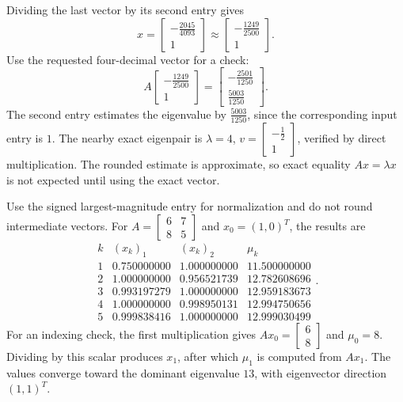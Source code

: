 Dividing the last vector by its second entry gives
\[x=\left[\begin{matrix}- \frac{2045}{4093}\\1\end{matrix}\right]\approx\left[\begin{matrix}- \frac{1249}{2500}\\1\end{matrix}\right].\]
Use the requested four-decimal vector for a check:
\[A\left[\begin{matrix}- \frac{1249}{2500}\\1\end{matrix}\right]=\left[\begin{matrix}- \frac{2501}{1250}\\\frac{5003}{1250}\end{matrix}\right].\]
The second entry estimates the eigenvalue by $\frac{5003}{1250}$,
since the corresponding input entry is $1$.
The nearby exact eigenpair is $\lambda=4$,
$v=\left[\begin{matrix}- \frac{1}{2}\\1\end{matrix}\right]$, verified by direct multiplication.
The rounded estimate is approximate, so exact equality $Ax=\lambda x$
is not expected until using the exact vector.

Use the signed largest-magnitude entry for normalization and do not
round intermediate vectors. For $A=\left[\begin{matrix}6 & 7\\8 & 5\end{matrix}\right]$ and $x_0=(1,0)^T$,
the results are
\[\begin{array}{c|rr|r}k&(x_k)_1&(x_k)_2&\mu_k\\\hline
1&0.750000000&1.000000000&11.500000000\\
2&1.000000000&0.956521739&12.782608696\\
3&0.993197279&1.000000000&12.959183673\\
4&1.000000000&0.998950131&12.994750656\\
5&0.999838416&1.000000000&12.999030499\end{array}.\]
For an indexing check, the first multiplication gives
$Ax_0=\left[\begin{matrix}6\\8\end{matrix}\right]$ and
$\mu_0=8$. Dividing by this scalar produces
$x_1$, after which $\mu_1$ is computed from $Ax_1$.
The values converge toward the dominant eigenvalue $13$,
with eigenvector direction $(1,1)^T$.

